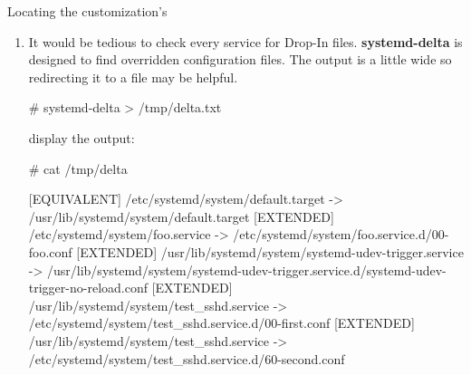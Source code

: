 \begin{Lab}
\begin{exe}{Locating the customization's}
\begin{enumerate}
	The output will show:
		\begin{itemize}
		\item service has a vendor default of "enabled" or "disabled"
		\item service has been manually "enabled" or "disabled"
		\item what the name and location of the vendor supplied config file
		\item the Drop-In directory and associated files
		\item limits and cgroup information 
		\item a few lines of the log associated with this service
		\end{itemize}
The output from the test system: 
		\begin{raw}
test_sshd.service - test
   Loaded: loaded (/usr/lib/systemd/system/test_sshd.service; disabled; vendor preset: disabled)
  Drop-In: /etc/systemd/system/test_sshd.service.d
           |-00-first.conf, 60-second.conf
   Active: active (running) since Wed 2019-08-14 08:44:50 CDT; 2s ago
 Main PID: 2629 (sshd)
    Tasks: 1 (limit: 3)
   Memory: 2.2M
   CGroup: /system.slice/test_sshd.service
           |-2629 /usr/sbin/sshd -D -oCiphers=aes256-gcm@openssh.com,chacha20-poly1305@openssh.com,aes256-ct>

Aug 14 08:44:50 rt.example.com systemd[1]: Starting test...
Aug 14 08:44:50 rt.example.com sshd[2629]: Server listening on 0.0.0.0 port 4242.
Aug 14 08:44:50 rt.example.com sshd[2629]: Server listening on :: port 4242.
Aug 14 08:44:50 rt.example.com systemd[1]: Started test.
		\end{raw}

		\item It would be tedious to check every service
			for Drop-In files. \textbf{systemd-delta} 
			is designed to find overridden configuration 
			files. The output is a little wide so 
			redirecting it to a file may be helpful. \\
			
			\begin{raw}
# systemd-delta > /tmp/delta.txt 
			\end{raw}

			display the output:
			\begin{rawscriptsize}
# cat /tmp/delta

[EQUIVALENT] /etc/systemd/system/default.target -> /usr/lib/systemd/system/default.target
[EXTENDED]   /etc/systemd/system/foo.service -> /etc/systemd/system/foo.service.d/00-foo.conf
[EXTENDED]   /usr/lib/systemd/system/systemd-udev-trigger.service -> 
				/usr/lib/systemd/system/systemd-udev-trigger.service.d/systemd-udev-trigger-no-reload.conf
[EXTENDED]   /usr/lib/systemd/system/test_sshd.service -> /etc/systemd/system/test_sshd.service.d/00-first.conf
[EXTENDED]   /usr/lib/systemd/system/test_sshd.service -> /etc/systemd/system/test_sshd.service.d/60-second.conf


\end{rawscriptsize}
\end{enumerate}
\end{exe}
\end{Lab}
